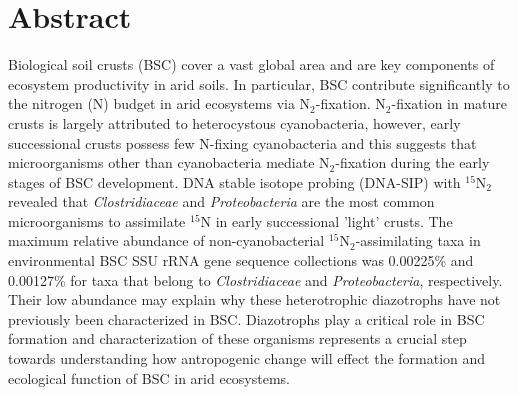 \section{Abstract}
Biological soil crusts (BSC) cover a vast global area and are key
components of ecosystem productivity in arid soils. In particular, BSC
contribute significantly to the nitrogen (N) budget in arid ecosystems
via N$_{2}$-fixation.  N$_{2}$-fixation in mature crusts is largely
attributed to heterocystous cyanobacteria, however, early successional
crusts possess few N-fixing cyanobacteria and this
suggests that microorganisms other than cyanobacteria mediate
N$_{2}$-fixation during the early stages of BSC development. DNA stable
isotope probing (DNA-SIP) with $^{15}$N$_{2}$ revealed that
\textit{Clostridiaceae} and \textit{Proteobacteria} are the most common
microorganisms to assimilate $^{15}$N in early successional 'light'
crusts.  The maximum relative abundance of non-cyanobacterial
$^{15}$N$_{2}$-assimilating taxa in environmental BSC SSU rRNA gene
sequence collections was 0.00225\% and 0.00127\% for taxa that belong
to \textit{Clostridiaceae} and \textit{Proteobacteria}, respectively.
Their low abundance may explain why these heterotrophic diazotrophs
have not previously been characterized in BSC.  Diazotrophs play a
critical role in BSC formation and characterization of these organisms
represents a crucial step towards understanding how antropogenic change
will effect the formation and ecological function of BSC in arid
ecosystems.


